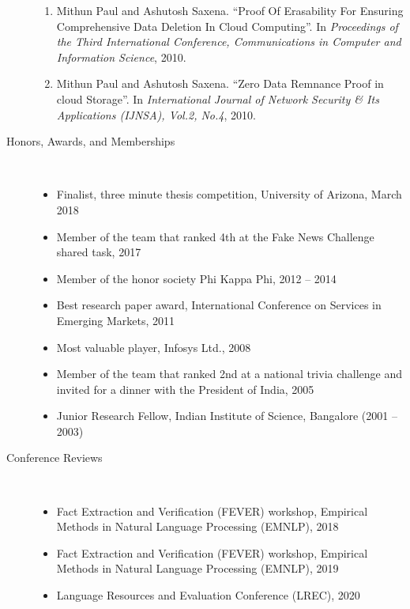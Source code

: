 \documentclass[10pt]{article}
\newcommand{\ve}[1]{{\em #1}} %
\newcommand{\ti}[1]{``#1''} %
\begin{document}
\begin{description}
\begin{enumerate}
\item  Mithun Paul and Ashutosh Saxena.   \ti{Proof Of Erasability For Ensuring Comprehensive Data Deletion In Cloud Computing}. In \ve{  Proceedings of the Third International Conference, Communications in Computer and Information Science}, 2010.

\item  Mithun Paul and Ashutosh Saxena.   \ti{Zero Data Remnance Proof in cloud Storage}. In \ve{  International Journal of Network Security \& Its Applications (IJNSA), Vol.2, No.4}, 2010.




\end{enumerate}





\bigskip

\vspace{-.3cm}
\item [Honors, Awards, and Memberships]\
\begin{itemize}
\itemsep-1em
\item Finalist, three minute thesis competition, University of Arizona, March 2018\\

\item Member of the team that ranked 4th at the Fake News Challenge shared task, 2017\\
\item Member of the honor society Phi Kappa Phi, 2012 -- 2014\\
\item Best research paper award, International Conference on Services in Emerging Markets, 2011\\
\item Most valuable player,  Infosys  Ltd., 2008\\
\item Member of the team that ranked 2nd at a national trivia challenge and invited for a dinner with the President of India, 2005\\
\item Junior Research Fellow, Indian Institute of Science, Bangalore (2001 – 2003)\\

\end{itemize}


\vspace{-.4cm}\item [Conference Reviews]\
\begin{itemize}
\itemsep-1em
\item Fact Extraction and Verification (FEVER) workshop, Empirical Methods in Natural Language Processing (EMNLP), 2018\\
\item Fact Extraction and Verification (FEVER) workshop, Empirical Methods in Natural Language Processing (EMNLP), 2019\\
\item Language Resources and Evaluation Conference (LREC), 2020\\


\end{itemize}
\end{description}
\end{document}
